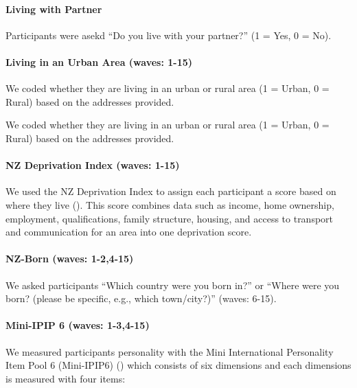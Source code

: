 \documentclass[
  singlecolumn,
  9pt]{article}
\let\oldparagraph\paragraph
\renewcommand{\paragraph}[1]{\oldparagraph{#1}\mbox{}}
\begin{document}
\paragraph{Living with Partner}\label{living-with-partner}

Participants were asekd ``Do you live with your partner?'' (1 = Yes, 0 =
No).

\paragraph{Living in an Urban Area (waves:
1-15)}\label{living-in-an-urban-area-waves-1-15}

We coded whether they are living in an urban or rural area (1 = Urban, 0
= Rural) based on the addresses provided.

We coded whether they are living in an urban or rural area (1 = Urban, 0
= Rural) based on the addresses provided.

\paragraph{NZ Deprivation Index (waves:
1-15)}\label{nz-deprivation-index-waves-1-15}

We used the NZ Deprivation Index to assign each participant a score
based on where they live (). This score combines data such as income, home ownership,
employment, qualifications, family structure, housing, and access to
transport and communication for an area into one deprivation score.

\paragraph{NZ-Born (waves: 1-2,4-15)}\label{nz-born-waves-1-24-15}

We asked participants ``Which country were you born in?'' or ``Where
were you born? (please be specific, e.g., which town/city?)'' (waves:
6-15).

\paragraph{Mini-IPIP 6 (waves:
1-3,4-15)}\label{mini-ipip-6-waves-1-34-15}

We measured participants personality with the Mini International
Personality Item Pool 6 (Mini-IPIP6) () which consists of six dimensions and each
dimensions is measured with four items:
\end{document}
